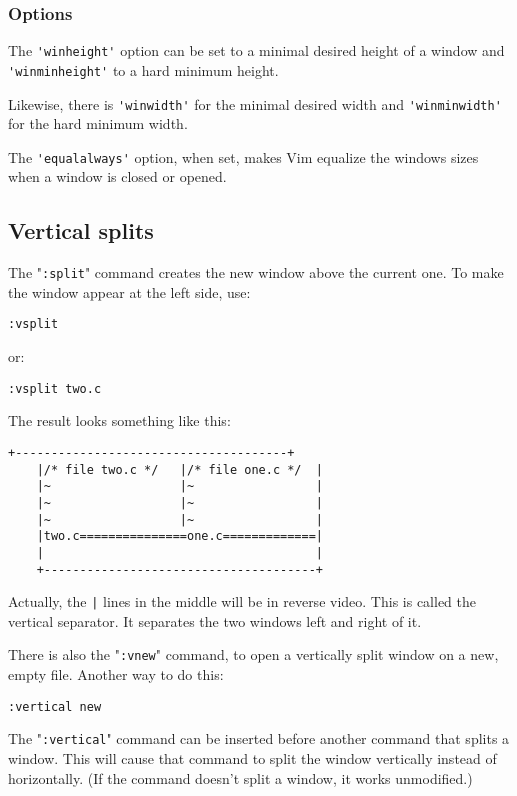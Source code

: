 \subsubsection{Options}
The \verb!'winheight'! option can be set to a minimal desired height of a window and \verb!'winminheight'! to a hard minimum height.

Likewise, there is \verb!'winwidth'! for the minimal desired width and \verb!'winminwidth'! for the hard minimum width.

The \verb!'equalalways'! option, when set, makes Vim equalize the windows sizes when a window is closed or opened.

\subsection{Vertical splits}
The "\verb!:split!" command creates the new window above the current one.
To make the window appear at the left side, use:

 \begin{Verbatim}[samepage=true]
 :vsplit
 \end{Verbatim}

or:
 \begin{Verbatim}[samepage=true]
 :vsplit two.c
 \end{Verbatim}

The result looks something like this:

\begin{Verbatim}[samepage=true]
    +--------------------------------------+
    |/* file two.c */   |/* file one.c */  |
    |~                  |~                 |
    |~                  |~                 |
    |~                  |~                 |
    |two.c===============one.c=============|
    |                                      |
    +--------------------------------------+
\end{Verbatim}

Actually, the \verb!|! lines in the middle will be in reverse video.
This is called the vertical separator.
It separates the two windows left and right of it.

There is also the "\verb!:vnew!" command, to open a vertically split window on a new, empty file.
Another way to do this:

 \begin{Verbatim}[samepage=true]
 :vertical new
 \end{Verbatim}

The "\verb!:vertical!" command can be inserted before another command that splits a window.
This will cause that command to split the window vertically instead of horizontally.
(If the command doesn't split a window, it works unmodified.)

